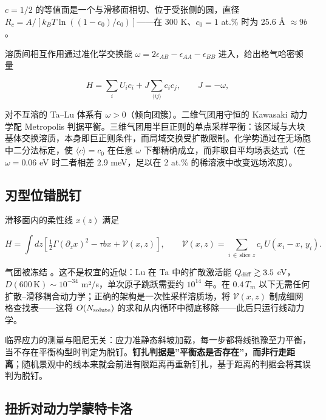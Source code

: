 \documentclass[11pt,a4paper]{article}
\begin{document}
\(c = 1/2\) 的等值面是一个与滑移面相切、位于受张侧的圆，直径 \(R_c = A/[k_BT\ln((1-c_0)/c_0)]\)------在 300 K、\(c_0 = 1\) at.\% 时为 25.6 Å \(\approx 9b\)。

溶质间相互作用通过准化学交换能 \cite{guggenheim1952} \(\omega = 2\epsilon_{AB} - \epsilon_{AA} - \epsilon_{BB}\) 进入，给出格气哈密顿量

\[H = \sum_i U_i c_i + J\sum_{\langle ij\rangle} c_i c_j,\qquad J = -\omega,\]

对不互溶的 Ta--Lu 体系有 \(\omega > 0\)（倾向团簇）。二维气团用守恒的 Kawasaki 动力学配 Metropolis 判据平衡。三维气团用半巨正则的单点采样平衡：该区域与大块基体交换溶质，本身即巨正则条件，而局域交换受扩散限制。化学势通过在无场胞中二分法标定，使 \(\langle c\rangle = c_0\) 在任意 \(\omega\) 下都精确成立，而非取自平均场表达式（在 \(\omega = 0.06\) eV 时二者相差 2.9 meV，足以在 2 at.\% 的稀溶液中改变远场浓度）。

\hypertarget{ux5203ux578bux4f4dux9519ux8131ux9489}{%
\subsection{刃型位错脱钉}\label{sec:ux5203ux578bux4f4dux9519ux8131ux9489}}

滑移面内的柔性线 \(x(z)\) 满足

\[H = \int\!dz\left[\tfrac12\Gamma(\partial_z x)^2 - \tau b x + \mathcal{V}(x,z)\right],\qquad \mathcal{V}(x,z) = \sum_{i\,\in\,\text{slice }z} c_i\,U(x_i - x,\,y_i).\]

气团被冻结 \cite{cottrell1949}。这不是权宜的近似：Lu 在 Ta 中的扩散激活能 \(Q_{\rm diff}\gtrsim3.5\) eV，\(D(600\,\mathrm{K})\sim10^{-34}\) m²/s，单次原子跳跃需要约 \(10^{14}\) 年。在 \(0.4\,T_m\) 以下无需任何扩散--滑移耦合动力学；正确的架构是一次性采样溶质场，将 \(\mathcal{V}(x,z)\) 制成细网格查找表------这将 \(O(N_{\rm solute})\) 的求和从内循环中彻底移除------此后只运行线动力学。

临界应力的测量与阻尼无关：应力准静态斜坡加载，每一步都将线弛豫至力平衡，当不存在平衡构型时判定为脱钉。\textbf{钉扎判据是''平衡态是否存在''，而非行走距离}；随机景观中的线本来就会前进有限距离再重新钉扎，基于距离的判据会将其误判为脱钉。

\hypertarget{ux626dux6298ux5bf9ux52a8ux529bux5b66ux8499ux7279ux5361ux6d1b}{%
\subsection{扭折对动力学蒙特卡洛}\label{sec:ux626dux6298ux5bf9ux52a8ux529bux5b66ux8499ux7279ux5361ux6d1b}}
\end{document}
